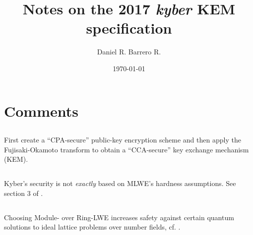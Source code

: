 \documentclass{amsart}
\title{Notes on the 2017 \emph{kyber} KEM specification}
\author{Daniel R. Barrero R.}
\date{\today}
\begin{document}
\maketitle

\section{}

\section{Comments}

\subsection{} First create a ``CPA-secure'' public-key encryption scheme and then apply the Fujisaki-Okamoto transform to obtain a ``CCA-secure'' key exchange mechanism (KEM).

\subsection{} Kyber's security is not \emph{exactly} based on MLWE's hardness assumptions. See section 3 of \cite{crystalsAuthors-kyber-2017}.

\subsection{} Choosing Module- over Ring-LWE increases safety against certain quantum solutions to ideal lattice problems over number fields, cf. \cite{biasseSong-16}.




%
\end{document}
